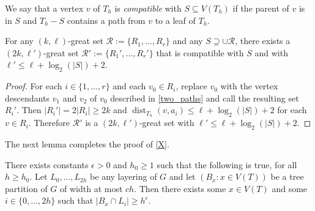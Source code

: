 \documentclass{patmorin}
\newcommand{\defin}[1]{\emph{\color{brightmaroon}#1}}
\DeclareMathOperator{\dist}{dist}
\begin{document}
We say that a vertex $v$ of $T_h$ is \defin{compatible} with $S\subseteq V(T_h)$ if the parent of $v$ is in $S$ and $T_h-S$ contains a path from $v$ to a leaf of $T_h$.
  

\begin{lem}\label{compatible_set}
  For any $(k,\ell)$-great set $\mathcal{R}:=\{R_1,\ldots,R_r\}$ and any $S\supseteq \cup\mathcal{R}$, there exists a $(2k,\ell')$-great set $\mathcal{R}':=\{R_1',\ldots,R_r'\}$ that is compatible with $S$ and with $\ell'\le \ell+\log_2(|S|)+2$.
\end{lem}

\begin{proof}
  For each $i\in\{1,\ldots,r\}$ and each $v_0\in R_i$, replace $v_0$ with the vertex descendants $v_1$ and $v_2$ of $v_0$ described in \cref{two_paths} and call the resulting set $R_i'$.   Then $|R_i'|=2|R_i|\ge 2k$ and $\dist_{T_h}(v,a_i)\le \ell+\log_2(|S|)+2$ for each $v\in R_i$.  Therefore $\mathcal{R}'$ is a $(2k,\ell')$-great set with $\ell'\le \ell+\log_2(|S|)+2$.
\end{proof}

The next lemma completes the proof of \cref{X}.
\begin{lem}
  There exists constants $\epsilon >0$ and $h_0\ge 1$ such that the following is true, for all $h \ge h_0$.  Let $L_0,\ldots,L_{2h}$ be any layering of $G$ and let $(B_x:x\in V(T))$ be a tree partition of $G$ of width at most $ch$.  Then there exists some $x\in V(T)$ and some $i\in\{0,\ldots,2h\}$ such that $|B_x\cap L_i| \ge h^{\epsilon}$.
\end{lem}
\end{document}
